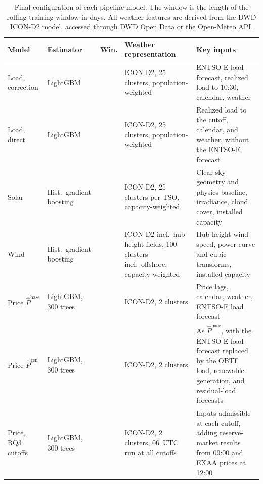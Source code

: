 \begin{table}[H]
  \centering
  \footnotesize
  \setlength{\tabcolsep}{3.8pt}
  \caption[Final model configurations.]
  {Final configuration of each pipeline model. The window is the length of the
  rolling training window in days. All weather features are derived from the DWD
  ICON-D2 model, accessed through DWD Open Data or the Open-Meteo API.}
  \label{tab:model_configs}
  \begin{tabular}{@{}>{\raggedright\arraybackslash}p{}
                  >{\raggedright\arraybackslash}p{}
                  >{\raggedright\arraybackslash}p{}
                  >{\raggedright\arraybackslash}p{}
                  >{\raggedright\arraybackslash}p{}@{}}
    \toprule
    Model & Estimator & Win. & Weather representation & Key inputs \\
    \midrule
    Load, correction
      & LightGBM & 224 & \mbox{ICON-D2}, 25 clusters, population-weighted
      & \mbox{ENTSO-E} load forecast, realized load to 10:30, calendar, weather \\
    \addlinespace
    Load, direct
      & LightGBM & 224 & \mbox{ICON-D2}, 25 clusters, population-weighted
      & Realized load to the cutoff, calendar, and weather, without the
        \mbox{ENTSO-E} forecast \\
    \addlinespace
    Solar
      & Hist.\ gradient boosting & 90 & \mbox{ICON-D2}, 25 clusters per TSO,
        capacity-weighted
      & Clear-sky geometry and physics baseline, irradiance, cloud cover,
        installed capacity \\
    \addlinespace
    Wind
      & Hist.\ gradient boosting & 180 & ICON-D2 incl.\ hub-height fields, 100 clusters
        incl.\ offshore, capacity-weighted
      & Hub-height wind speed, power-curve and cubic transforms, installed
        capacity \\
    \addlinespace
    Price \(\hat{P}^{\mathrm{base}}\)
      & LightGBM, 300 trees & 70 & \mbox{ICON-D2}, 2 clusters
      & Price lags, calendar, weather, \mbox{ENTSO-E} load forecast \\
    \addlinespace
    Price \(\hat{P}^{\mathrm{gen}}\)
      & LightGBM, 300 trees & 70 & \mbox{ICON-D2}, 2 clusters
      & As \(\hat{P}^{\mathrm{base}}\), with the \mbox{ENTSO-E} load forecast
        replaced by the OBTF load, renewable-generation, and residual-load
        forecasts \\
    \addlinespace
    Price, RQ3 cutoffs
      & LightGBM, 300 trees & 70 & \mbox{ICON-D2}, 2 clusters, 06~UTC run
        at all cutoffs
      & Inputs admissible at each cutoff, adding reserve-market results from
        09:00 and EXAA prices at 12:00 \\
    \bottomrule
  \end{tabular}
\end{table}

